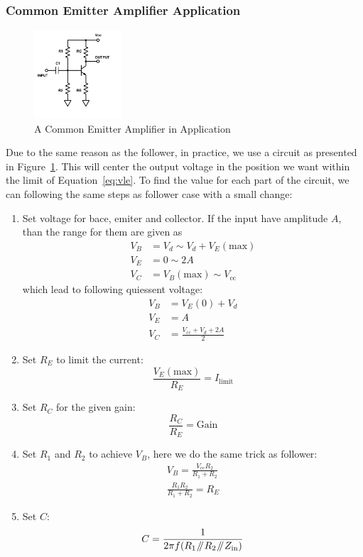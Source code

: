 \documentclass[aps,prl,reprint]{revtex4-1}
\newcommand{\vcc}{V_\text{cc}}
\newcommand{\parallelsum}{\mathbin{\!/\mkern-5mu/\!}}
\begin{document}
\subsubsection{Common Emitter Amplifier Application}
\begin{figure}[h]
    \centering
    \includegraphics[height=1.3in]{image/Common-Emitter-Amplifier-Full.pdf}
    \caption{A Common Emitter Amplifier in Application}
    \label{fig:amplifierFull}
\end{figure}
Due to the same reason as the follower, in practice, we use a circuit as presented in Figure~\ref{fig:amplifierFull}. This will center the output voltage in the position we want within the limit of Equation~\ref{eq:vle}. To find the value for each part of the circuit, we can following the same steps as follower case with a small change:
\begin{enumerate}
    \item Set voltage for bace, emiter and collector. If the input have amplitude $A$, than the range for them are given as
    \begin{align*}
        V_B &= V_d \sim V_d + V_E(\text{max}) \\
        V_E &= 0 \sim 2A \\
        V_C &= V_B(\text{max}) \sim \vcc
    \end{align*}
    which lead to following quiessent voltage:
    \begin{align*}
        V_B &= V_E(0) + V_d \\
        V_E &= A \\
        V_C &= \frac{\vcc + V_d + 2 A}{2}
    \end{align*}
    \item Set $R_E$ to limit the current:
    \[
    \frac{V_E(\text{max})}{R_E} = I_\text{limit}
    \]
    \item Set $R_C$ for the given gain:
    \[
    \frac{R_C}{R_E} = \text{Gain}
    \]
    \item Set $R_1$ and $R_2$ to achieve $V_B$, here we do the same trick as follower:
    \begin{align*}
        V_B = \frac{\vcc R_2}{R_1 + R_2}\\
        \frac{R_1R_2}{R_1 + R_2} = R_E
    \end{align*}
    \item Set $C$:
    \[
    C = \frac{1}{2\pi f (R_1 \parallelsum R_2 \parallelsum Z_\text{in})}
    \]
\end{enumerate}
\end{document}
